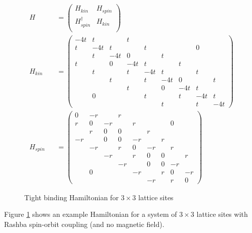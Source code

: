 \documentclass[11pt]{article}
\newcommand{\inp}[1]{\ensuremath{\left(#1\right)}}
\begin{document}
\begin{figure}
    \begin{align*}
        H &&= \inp{
           \begin{array}{cc}
                H_{kin}  & H_{spin} \\
                H_{spin}^\dagger & H_{kin} \\
           \end{array}} \\
        H_{kin} &&= \inp{
            \begin{array}{ccccccccc}
                -4t & t &  & t\\
                t & -4t & t &  & t &  &  & 0\\
                & t & -4t & 0 &  & t\\
                t &  & 0 & -4t & t &  & t\\
                & t &  & t & -4t & t &  & t\\
                &  & t &  & t & -4t & 0 &  & t\\
                &  &  & t &  & 0 & -4t & t\\
                & 0 &  &  & t &  & t & -4t & t\\
                &  &  &  &  & t &  & t & -4t\end{array}
        } \\
        H_{spin} &&= \inp{
            \begin{array}{ccccccccc}
                0 & -r &  & r\\
                r & 0 & -r &  & r &  &  & 0\\
                & r & 0 & 0 &  & r\\
                -r &  & 0 & 0 & -r &  & r\\
                & -r &  & r & 0 & -r &  & r\\
                &  & -r &  & r & 0 & 0 &  & r\\
                &  &  & -r &  & 0 & 0 & -r\\
                & 0 &  &  & -r &  & r & 0 & -r\\
                &  &  &  &  & -r &  & r & 0\end{array}
        } 
    \end{align*}
    \caption{Tight binding Hamiltonian for $ 3 \times 3 $ lattice sites}
    \label{fig:hamiltonian}
\end{figure}

Figure \ref{fig:hamiltonian} shows an example Hamiltonian for a system of
$3 \times 3$ lattice sites with Rashba spin-orbit coupling (and no magnetic
field).
\end{document}
